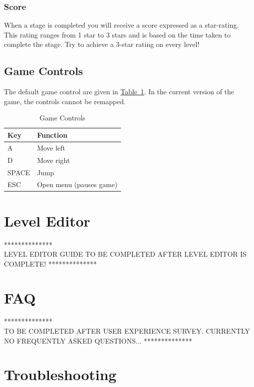 \documentclass[12pt, titlepage]{article}
\begin{document}
\subsubsection{Score}
When a stage is completed you will receive a score expressed as a star-rating.  This rating ranges from 1 star to 3 stars and is based on the time taken to complete the stage.  Try to achieve a 3-star rating on every level!


\subsection{Game Controls}
The default game control are given in \hyperref[tab:ctrl]{Table~\ref*{tab:ctrl}}.  In the current version of the game, the controls cannot be remapped.


\begin{table}[H]
\caption{Game Controls} \label{tab:ctrl}
\centering
\begin{tabularx}{0.65\textwidth}{p{2.5cm}X}
\toprule {\bf Key} & {\bf Function}\\
\midrule
A & Move left\\
D & Move right\\
SPACE & Jump\\
ESC & Open menu (pauses game)\\
\bottomrule
\end{tabularx}
\end{table}

\section{Level Editor}
\label{sec:edit}
{\center ***************\\}
\noindent LEVEL EDITOR GUIDE TO BE COMPLETED AFTER LEVEL EDITOR IS COMPLETE!
{\center ***************\\}

\section{FAQ}
\label{sec:faq}
{\center ***************\\}
\noindent TO BE COMPLETED AFTER USER EXPERIENCE SURVEY.  CURRENTLY NO FREQUENTLY ASKED QUESTIONS...
{\center ***************\\}

\section{Troubleshooting}
\label{sec:trouble}
\end{document}
